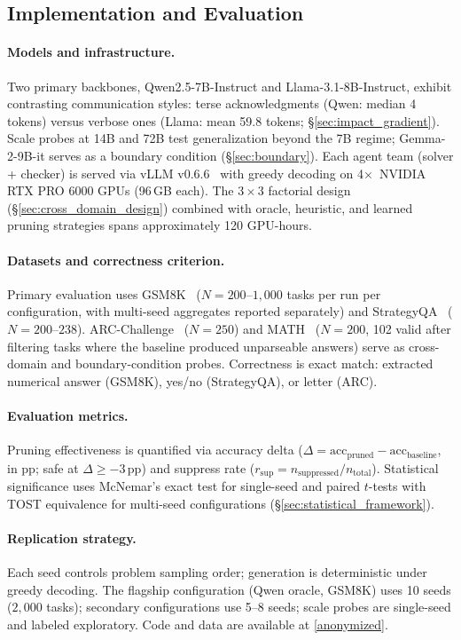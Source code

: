 \subsection{Implementation and Evaluation}
\label{sec:implementation}

\paragraph{Models and infrastructure.}
Two primary backbones, Qwen2.5-7B-Instruct and Llama-3.1-8B-Instruct, exhibit contrasting communication styles: terse acknowledgments (Qwen: median 4 tokens) versus verbose ones (Llama: mean 59.8 tokens; \S\ref{sec:impact_gradient}).
Scale probes at 14B and 72B test generalization beyond the 7B regime; Gemma-2-9B-it serves as a boundary condition (\S\ref{sec:boundary}).
Each agent team (solver + checker) is served via vLLM v0.6.6~\cite{kwon_vllm_2023} with greedy decoding on 4$\times$~NVIDIA RTX PRO 6000 GPUs (96\,GB each).
The $3 \times 3$ factorial design (\S\ref{sec:cross_domain_design}) combined with oracle, heuristic, and learned pruning strategies spans approximately 120 GPU-hours.

\paragraph{Datasets and correctness criterion.}
Primary evaluation uses GSM8K~\cite{cobbe_gsm8k_2021} ($N{=}200$--$1{,}000$ tasks per run per configuration, with multi-seed aggregates reported separately) and StrategyQA~\cite{geva_strategyqa_2021} ($N{=}200$--$238$).
ARC-Challenge~\cite{clark_arc_2018} ($N{=}250$) and MATH~\cite{hendrycks_math_2021} ($N{=}200$, 102 valid after filtering tasks where the baseline produced unparseable answers) serve as cross-domain and boundary-condition probes.
Correctness is exact match: extracted numerical answer (GSM8K), yes/no (StrategyQA), or letter (ARC).

\paragraph{Evaluation metrics.}
Pruning effectiveness is quantified via accuracy delta ($\Delta = \mathrm{acc}_{\text{pruned}} - \mathrm{acc}_{\text{baseline}}$, in pp; safe at $\Delta \geq -3$\,pp) and suppress rate ($r_{\text{sup}} = n_{\text{suppressed}} / n_{\text{total}}$).
Statistical significance uses McNemar's exact test for single-seed and paired $t$-tests with TOST equivalence for multi-seed configurations (\S\ref{sec:statistical_framework}).

\paragraph{Replication strategy.}
Each seed controls problem sampling order; generation is deterministic under greedy decoding. The flagship configuration (Qwen oracle, GSM8K) uses 10 seeds ($2{,}000$ tasks); secondary configurations use 5--8 seeds; scale probes are single-seed and labeled exploratory. Code and data are available at \url{[anonymized]}.
